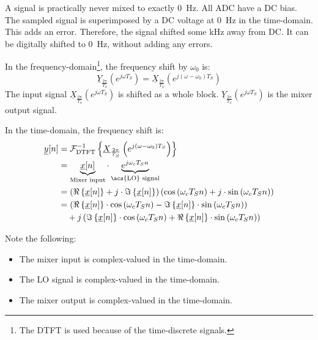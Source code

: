 \begin{refsection}
\begin{remark}
	A signal is practically never mixed to exactly \SI{0}{Hz}. All ADC have a DC bias. The sampled signal is superimposed by a DC voltage at \SI{0}{Hz} in the time-domain. This adds an error. Therefore, the signal shifted some \si{kHz} away from DC. It can be digitally shifted to \SI{0}{Hz}, without adding any errors.
\end{remark}

In the frequency-domain\footnote{The \ac{DTFT} is used because of the time-discrete signals.}, the frequency shift by $\omega_0$ is:
\begin{equation}
	\underline{Y}_{\frac{2\pi}{T_S}}\left(e^{j \omega T_S}\right) = \underline{X}_{\frac{2\pi}{T_S}}\left(e^{j\left(\omega - \omega_0\right)T_S}\right)
\end{equation}
The input signal $\underline{X}_{\frac{2\pi}{T_S}}\left(e^{j \omega T_S}\right)$ is shifted as a whole block. $\underline{Y}_{\frac{2\pi}{T_S}}\left(e^{j \omega T_S}\right)$ is the mixer output signal.

In the time-domain, the frequency shift is:
\begin{equation}
	\begin{split}
		\underline{y}[n] &= \mathcal{F}_{\mathrm{DTFT}}^{-1}\left\{\underline{X}_{\frac{2\pi}{T_S}}\left(e^{j\left(\omega - \omega_0\right)T_S}\right)\right\} \\
		 &= \underbrace{\underline{x}[n]}_{\text{Mixer input}} \cdot \underbrace{e^{j \omega_c T_S n}}_{\text{\acs{LO} signal}} \\
		 &= \left(\Re\left\{\underline{x}[n]\right\} + j \cdot \Im\left\{\underline{x}[n]\right\}\right) \left(\cos\left(\omega_c T_S n\right) + j \cdot \sin\left(\omega_c T_S n\right)\right) \\
		 &= \left( \Re\left\{\underline{x}[n]\right\} \cdot \cos\left(\omega_c T_S n\right) - \Im\left\{\underline{x}[n]\right\} \cdot \sin\left(\omega_c T_S n\right) \right) \\ &\quad + j \left( \Im\left\{\underline{x}[n]\right\} \cdot \cos\left(\omega_c T_S n\right) + \Re\left\{\underline{x}[n]\right\} \cdot \sin\left(\omega_c T_S n\right) \right)
	\end{split}
	\label{eq:ch06:digi_mix}
\end{equation}

Note the following:
\begin{itemize}
	\item The mixer input is complex-valued in the time-domain.
	\item The \ac{LO} signal is complex-valued in the time-domain.
	\item The mixer output is complex-valued in the time-domain.
\end{itemize}


\end{refsection}
